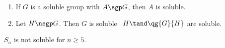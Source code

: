 \documentclass[a4paper]{article}
\begin{document}
\begin{ttheorem}
  \begin{enumerate}
    \item If \( G \) is a soluble group with \( A\sgp G \), then \( A \) is soluble.
    \item Let \( H\nsgp G \). Then \( G \) is soluble \iff~\( H\tand \qg{G}{H} \) are soluble.
  \end{enumerate}
\end{ttheorem}

\begin{tcorollary}
  \( S_n \) is not soluble for \( n\geq 5 \).
\end{tcorollary}
\end{document}
